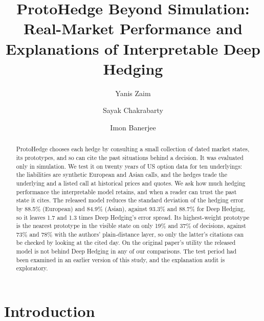 \documentclass[runningheads]{llncs}
\begin{document}
\title{ProtoHedge Beyond Simulation: Real-Market Performance and Explanations of Interpretable Deep Hedging}

\author{Yanis Zaim \and Sayak Chakrabarty \and Imon Banerjee}

\maketitle

\begin{abstract}
ProtoHedge chooses each hedge by consulting a small collection of dated market states, its prototypes,
and so can cite the past situations behind a decision. It was evaluated only in simulation. We test it on
twenty years of US option data for ten underlyings: the liabilities are synthetic European and Asian calls,
and the hedges trade the underlying and a listed call at historical prices and quotes. We ask how much
hedging performance the interpretable model retains, and when a reader can trust the past state it cites.
The released model reduces the standard deviation of the hedging error by 88.5\% (European) and 84.9\%
(Asian), against 93.3\% and 88.7\% for Deep Hedging, so it leaves 1.7 and 1.3 times Deep Hedging's error
spread. Its highest-weight prototype is the nearest prototype in the visible state on only 19\% and 37\% of
decisions, against 73\% and 78\% with the authors' plain-distance layer, so only the latter's citations
can be checked by looking at the cited day. On the original paper's utility the released model is not
behind Deep Hedging in any of our comparisons. The test period had been examined in an earlier version of
this study, and the explanation audit is exploratory.

\end{abstract}

\section{Introduction}
\end{document}
